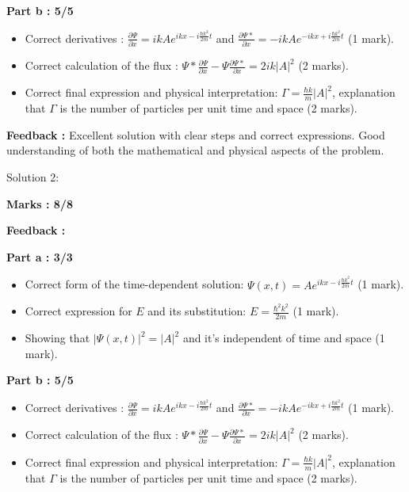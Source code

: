 \documentclass[a4paper,11pt]{article}
\begin{document}
\textbf{Part b : 5/5}

\begin{itemize}
    \item Correct derivatives : $\frac{\partial \Psi}{\partial x} = ikAe^{ikx-i\frac{\hbar k^2}{2m}t}$ and $\frac{\partial \Psi*}{\partial x} = -ikAe^{-ikx+i\frac{\hbar k^2}{2m}t}$ (1 mark).
    \item Correct calculation of the flux : $\Psi* \frac{\partial\Psi}{\partial x} - \Psi \frac{\partial\Psi*}{\partial x} = 2ik|A|^2$ (2 marks).
    \item Correct final expression and physical interpretation: $\Gamma = \frac{\hbar k }{m} |A|^2$, explanation that $\Gamma$ is the number of particles per unit time and space (2 marks).
\end{itemize}


\textbf{Feedback :}
Excellent solution with clear steps and correct expressions. Good understanding of both the mathematical and physical aspects of the problem.


Solution 2:

\textbf{Marks : 8/8}

\textbf{Feedback : }

\textbf{Part a : 3/3}

\begin{itemize}
    \item Correct form of the time-dependent solution: $\Psi(x,t) = Ae^{ikx-i\frac{\hbar k^2}{2m}t}$ (1 mark).
    \item Correct expression for $E$ and its substitution: $E = \frac{\hbar^2 k^2}{2m}$ (1 mark).
    \item Showing that $|\Psi(x,t)|^2 = |A|^2$ and it's independent of time and space (1 mark).
\end{itemize}


\textbf{Part b : 5/5}

\begin{itemize}
    \item Correct derivatives : $\frac{\partial \Psi}{\partial x} = ikAe^{ikx-i\frac{\hbar k^2}{2m}t}$ and $\frac{\partial \Psi*}{\partial x} = -ikAe^{-ikx+i\frac{\hbar k^2}{2m}t}$ (1 mark).
    \item Correct calculation of the flux : $\Psi* \frac{\partial\Psi}{\partial x} - \Psi \frac{\partial\Psi*}{\partial x} = 2ik|A|^2$ (2 marks).
    \item Correct final expression and physical interpretation: $\Gamma = \frac{\hbar k }{m} |A|^2$, explanation that $\Gamma$ is the number of particles per unit time and space (2 marks).
\end{itemize}
\end{document}
